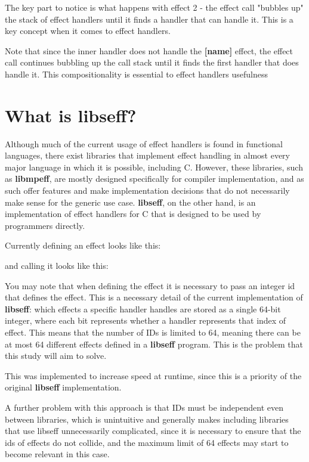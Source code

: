 \documentclass[logo,bsc,singlespacing,parskip,online]{infthesis}
\begin{document}
The key part to notice is what happens with effect 2 - the effect call "bubbles up" the stack of effect handlers until it finds a handler that can handle it. This is a key concept when it comes to effect handlers.

Note that since the inner handler does not handle the \textbf{[name]} effect, the effect call continues bubbling up the call stack until it finds the first handler that does handle it. This compositionality is essential to effect handlers usefulness %







\section{What is libseff?}

Although much of the current usage of effect handlers is found in functional languages, there exist libraries that implement effect handling in almost every major language in which it is possible, including C. However, these libraries, such as \textbf{libmpeff}, are mostly designed specifically for compiler implementation, and as such offer features and make implementation decisions that do not necessarily make sense for the generic use case.\cite{libmprompt} \textbf{libseff}, on the other hand, is an implementation of effect handlers for C that is designed to be used by programmers directly.\cite{libseff_paper}

Currently defining an effect looks like this: %

and calling it looks like this: %

You may note that when defining the effect it is necessary to pass an integer id that defines the effect. This is a necessary detail of the current implementation of \textbf{libseff}: which effects a specific handler handles are stored as a single 64-bit integer, where each bit represents whether a handler represents that index of effect. This means that the number of IDs is limited to 64, meaning there can be at most 64 different  effects defined in a \textbf{libseff} program. This is the problem that this study will aim to solve.

This was implemented to increase speed at runtime, since this is a priority of the original \textbf{libseff} implementation. %

A further problem with this approach is that IDs must be independent even between libraries, which is unintuitive and generally makes including libraries that use libseff unnecessarily complicated, since it is necessary to ensure that the ids of effects do not collide, and the maximum limit of 64 effects may start to become relevant in this case.
\end{document}
